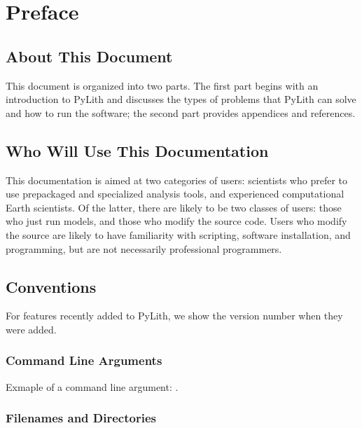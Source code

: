 
\chapter{Preface}


\section{About This Document}

This document is organized into two parts. The first part begins with
an introduction to PyLith and discusses the types of problems that
PyLith can solve and how to run the software; the second part provides
appendices and references.


\section{Who Will Use This Documentation}

This documentation is aimed at two categories of users: scientists
who prefer to use prepackaged and specialized analysis tools, and
experienced computational Earth scientists. Of the latter, there are
likely to be two classes of users: those who just run models, and
those who modify the source code. Users who modify the source are
likely to have familiarity with scripting, software installation,
and programming, but are not necessarily professional programmers.

\section{Conventions}


For features recently added to PyLith, we show the version number when
they were added.\newfeature{\pylithVersion}

\subsection{Command Line Arguments}

Exmaple of a command line argument: .

\subsection{Filenames and Directories}

